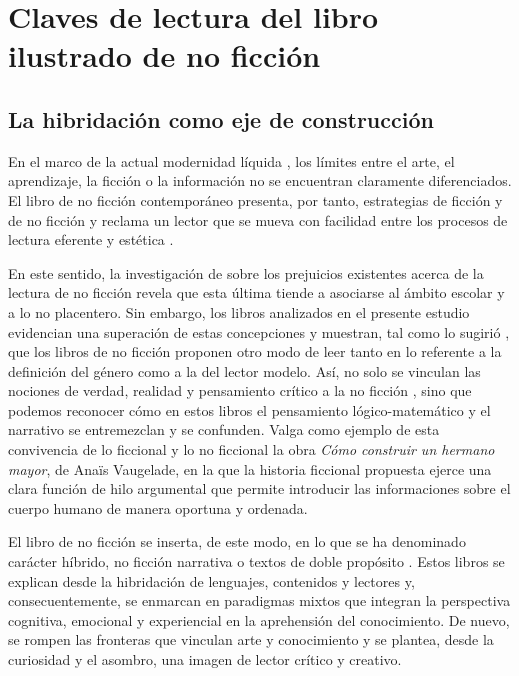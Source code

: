 \documentclass[spanish]{textolivre}
\begin{document}
\section{Claves de lectura del libro ilustrado de no ficción}\label{sec-conduta}
\subsection{La hibridación como eje de construcción}
En el marco de la actual modernidad líquida \cite{bauman_modernidad_2017}, los límites entre el arte, el aprendizaje, la ficción o la información no se encuentran claramente diferenciados. El libro de no ficción contemporáneo presenta, por tanto, estrategias de ficción y de no ficción y reclama un lector que se mueva con facilidad entre los procesos de lectura eferente y estética \cite{rosenblatt_literatura_2002}.

En este sentido, la investigación de \textcite{alexander_pleasures_2018} sobre los prejuicios existentes acerca de la lectura de no ficción revela que esta última tiende a asociarse al ámbito escolar y a lo no placentero. Sin embargo, los libros analizados en el presente estudio evidencian una superación de estas concepciones y muestran, tal como lo sugirió \textcite{bader_american_1976}, que los libros de no ficción proponen otro modo de leer tanto en lo referente a la definición del género como a la del lector modelo. Así, no solo se vinculan las nociones de verdad, realidad y pensamiento crítico a la no ficción \cite{yenika-agbaw_why_2018}, sino que podemos reconocer cómo en estos libros el pensamiento lógico-matemático y el narrativo \cite{bruner_realidad_2010} se entremezclan y se confunden. Valga como ejemplo de esta convivencia de lo ficcional y lo no ficcional la obra \textit{Cómo construir un hermano mayor}, de Anaïs Vaugelade, en la que la historia ficcional propuesta ejerce una clara función de hilo argumental que permite introducir las informaciones sobre el cuerpo humano de manera oportuna y ordenada.

El libro de no ficción se inserta, de este modo, en lo que se ha denominado carácter híbrido, no ficción narrativa o textos de doble propósito \cite{graff_revisiting_2020,grilli_non-fiction_2020a,pappas_information_2006,romero_oliva_validacion_2021,smith_navigating_2019,von-merveldt_informational_2018}. Estos libros se explican desde la hibridación de lenguajes, contenidos y lectores y, consecuentemente, se enmarcan en paradigmas mixtos que integran la perspectiva cognitiva, emocional y experiencial en la aprehensión del conocimiento. De nuevo, se rompen las fronteras que vinculan arte y conocimiento y se plantea, desde la curiosidad y el asombro, una imagen de lector crítico y creativo.
\end{document}
